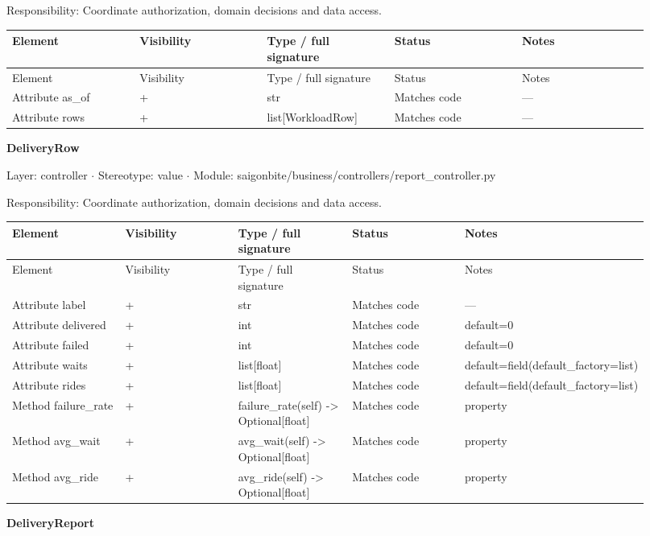 Responsibility: Coordinate authorization, domain decisions and data access.

\begin{longtable}{>{\raggedright\arraybackslash}p{0.1840\linewidth}>{\raggedright\arraybackslash}p{0.1840\linewidth}>{\raggedright\arraybackslash}p{0.1840\linewidth}>{\raggedright\arraybackslash}p{0.1840\linewidth}>{\raggedright\arraybackslash}p{0.1840\linewidth}}
Element & Visibility & Type / full signature & Status & Notes \\
\hline\endfirsthead
Element & Visibility & Type / full signature & Status & Notes \\
\hline\endhead
Attribute as\_of & + & str & Matches code & --- \\
Attribute rows & + & list[WorkloadRow] & Matches code & --- \\
\end{longtable}
\textbf{DeliveryRow}

Layer: controller \ensuremath{\cdot} Stereotype: \guillemotleft{}value\guillemotright{} \ensuremath{\cdot} Module: saigonbite/business/controllers/report\_controller.py

Responsibility: Coordinate authorization, domain decisions and data access.

\begin{longtable}{>{\raggedright\arraybackslash}p{0.1840\linewidth}>{\raggedright\arraybackslash}p{0.1840\linewidth}>{\raggedright\arraybackslash}p{0.1840\linewidth}>{\raggedright\arraybackslash}p{0.1840\linewidth}>{\raggedright\arraybackslash}p{0.1840\linewidth}}
Element & Visibility & Type / full signature & Status & Notes \\
\hline\endfirsthead
Element & Visibility & Type / full signature & Status & Notes \\
\hline\endhead
Attribute label & + & str & Matches code & --- \\
Attribute delivered & + & int & Matches code & default=0 \\
Attribute failed & + & int & Matches code & default=0 \\
Attribute waits & + & list[float] & Matches code & default=field(default\_factory=list) \\
Attribute rides & + & list[float] & Matches code & default=field(default\_factory=list) \\
Method failure\_rate & + & failure\_rate(self) -\textgreater{} Optional[float] & Matches code & property \\
Method avg\_wait & + & avg\_wait(self) -\textgreater{} Optional[float] & Matches code & property \\
Method avg\_ride & + & avg\_ride(self) -\textgreater{} Optional[float] & Matches code & property \\
\end{longtable}
\textbf{DeliveryReport}

